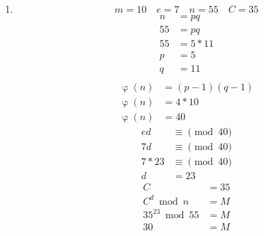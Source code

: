 \documentclass[11pt]{article}
\begin{document}
\begin{enumerate}
\item %
\[
m = 10 \quad e = 7 \quad n = 55 \quad C = 35
\]
\begin{align*}
n & = pq \\
55 & = pq \\
55 & = 5 * 11 \\
p & = 5 \\
q & = 11 \\
\end{align*}
\begin{align*}
\upvarphi(n) & = (p - 1)(q - 1) \\
\upvarphi(n) & = 4 * 10 \\
\upvarphi(n) & = 40
\end{align*}
\begin{align*}
ed & \equiv \pmod{40} \\
7d & \equiv \pmod{40} \\
7 * 23 & \equiv \pmod{40} \\
d & = 23
\end{align*}
\begin{align*}
C & = 35 \\
C^d \bmod n & = M \\
35^{23} \bmod 55 & = M \\
30 & = M
\end{align*}
\end{enumerate}
\end{document}
